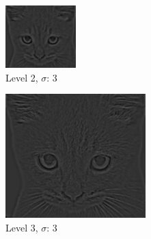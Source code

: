 \documentclass{article}
\begin{document}
\begin{minipage}{\linewidth}
    \centering
    \begin{minipage}{0.45\linewidth}
        \begin{figure}[H]
            \includegraphics[width=\linewidth]{Ejercicio2e/cat2.png}          
			\caption{Level 2, $\sigma$: 3}
        \end{figure}
    \end{minipage}
    \hspace{0.05\linewidth}
    \begin{minipage}{0.45\linewidth}
        \begin{figure}[H]
            \includegraphics[width=\linewidth]{Ejercicio2e/cat3.png}          
			\caption{Level 3, $\sigma$: 3}
        \end{figure}
    \end{minipage}   
    

\end{minipage}
\end{document}
